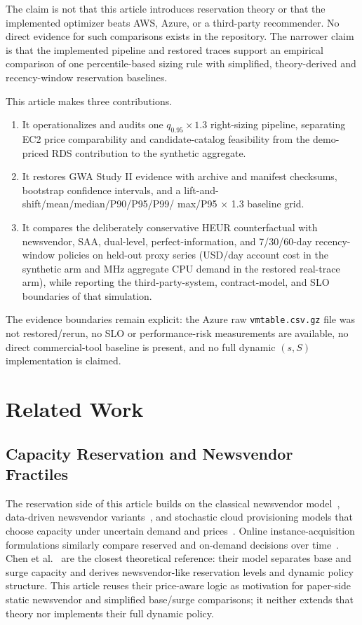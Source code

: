 \documentclass[11pt]{article}
\begin{document}
The claim is not that this article introduces reservation theory or that the
implemented optimizer beats AWS, Azure, or a third-party recommender. No
direct evidence for such comparisons exists in the repository. The narrower
claim is that the implemented pipeline and restored traces support an
empirical comparison of one percentile-based sizing rule with simplified,
theory-derived and recency-window reservation baselines.

This article makes three contributions.

\begin{enumerate}
\item It operationalizes and audits one \(q_{0.95}\times1.3\) right-sizing
pipeline, separating EC2 price comparability and candidate-catalog feasibility
from the demo-priced RDS contribution to the synthetic aggregate.
\item It restores GWA Study II evidence with archive and manifest checksums,
bootstrap confidence intervals, and a lift-and-shift/mean/median/P90/P95/P99/
max/P95 \(\times\) 1.3 baseline grid.
\item It compares the deliberately conservative HEUR counterfactual with
newsvendor, SAA, dual-level, perfect-information, and 7/30/60-day
recency-window policies on held-out proxy series (USD/day account cost in the
synthetic arm and MHz aggregate CPU demand in the restored real-trace arm),
while reporting the third-party-system, contract-model, and SLO boundaries of
that simulation.
\end{enumerate}

The evidence boundaries remain explicit: the Azure raw
\texttt{vmtable.csv.gz} file was not restored/rerun, no SLO or
performance-risk measurements are available, no direct commercial-tool
baseline is present, and no full dynamic $(s,S)$ implementation is claimed.

\section{Related Work}

\subsection{Capacity Reservation and Newsvendor Fractiles}

The reservation side of this article builds on the classical newsvendor
model~\cite{arrow1951inventory}, data-driven newsvendor
variants~\cite{ban2019newsvendor}, and stochastic cloud provisioning models
that choose capacity under uncertain demand and prices~\cite{chaisiri2012provisioning,bulbul2021provisioning}.
Online instance-acquisition formulations similarly compare reserved and
on-demand decisions over time~\cite{wang2014optimal,wang2014dynamic}.
Chen et al.~\cite{chen2024capacity} are the closest theoretical reference:
their model separates base and surge capacity and derives newsvendor-like
reservation levels and dynamic policy structure. This article reuses their
price-aware logic as motivation for paper-side static newsvendor and
simplified base/surge comparisons; it neither extends that theory nor
implements their full dynamic policy.
\end{document}

